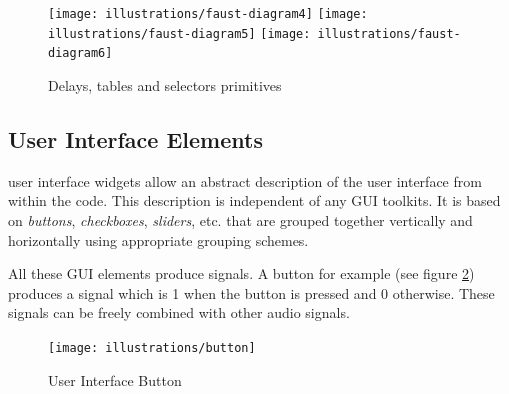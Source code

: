 \begin{figure}
\centering
\texttt{[image: illustrations/faust-diagram4]}
\texttt{[image: illustrations/faust-diagram5]}
\texttt{[image: illustrations/faust-diagram6]}
\caption{Delays, tables and selectors primitives }
\label{fig:delays}
\end{figure}

\subsection{User Interface Elements}

\faust user interface widgets allow an abstract description of the user interface from within the \faust code. This description is
independent of any GUI toolkits. It is based on \emph{buttons}, \emph{checkboxes}, \emph{sliders}, etc. that are grouped together 
vertically and horizontally using appropriate grouping schemes.

All these GUI elements produce signals. A button for example (see figure \ref{fig:button}) produces a signal which is 1 when the button is pressed and 0 otherwise. These signals can be freely combined with other audio signals. 

\begin{figure}[h]
\centering
\texttt{[image: illustrations/button]}
\caption{User Interface Button}
\label{fig:button}
\end{figure}

\bigskip

